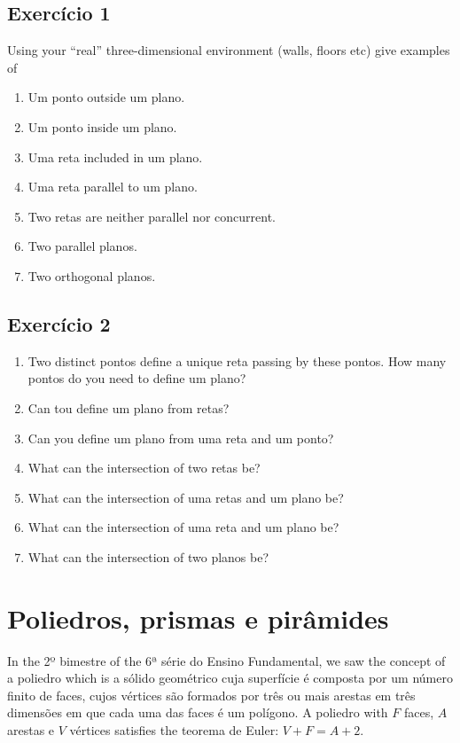\subsection*{Exercício 1}

Using your ``real'' three-dimensional environment (walls, floors etc)
give examples of

\begin{enumerate}
\item Um ponto outside um plano.
\item Um ponto inside um plano.
\item Uma reta included in um plano.
\item Uma reta parallel to um plano.
\item Two retas are neither parallel nor concurrent.
\item Two parallel planos.
\item Two orthogonal planos.
\end{enumerate}

\subsection*{Exercício 2}

\begin{enumerate}
\item Two distinct pontos define a unique reta passing by these pontos. How
  many pontos do you need to define um plano?
\item Can tou define um plano from retas?
\item Can you define um plano from uma reta and um ponto?
\item What can the intersection of two retas be?
\item What can the intersection of uma retas and um plano be?
\item What can the intersection of uma reta and um plano be?
\item What can the intersection of two planos be?
\end{enumerate}

\section{Poliedros, prismas e pirâmides}

In the 2º bimestre of the 6ª série do Ensino Fundamental, we saw the concept of
a poliedro which is a sólido geométrico cuja superfície é composta por um número
finito de faces, cujos vértices são formados por três ou mais arestas em três
dimensões em que cada uma das faces é um polígono. A poliedro with $F$ faces,
$A$ arestas e $V$ vértices satisfies the teorema de Euler: $V + F = A + 2$.

